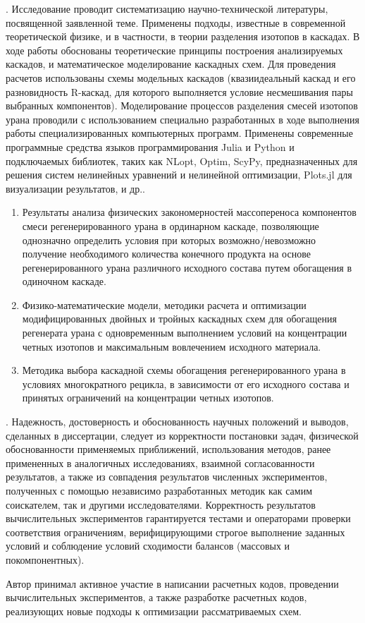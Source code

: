 {\methods}.
Исследование проводит систематизацию научно-технической литературы, посвященной заявленной теме.
Применены подходы, известные в современной теоретической физике, и в частности, в теории разделения изотопов в каскадах.
В ходе работы обоснованы теоретические принципы построения анализируемых каскадов, и математическое моделирование каскадных схем.
Для проведения расчетов использованы схемы модельных каскадов (квазиидеальный каскад и его разновидность R-каскад, для которого выполняется условие несмешивания пары выбранных компонентов). Моделирование процессов разделения смесей изотопов урана проводили с использованием специально разработанных в ходе выполнения работы специализированных компьютерных программ. Применены современные программные средства языков программирования Julia и Python и подключаемых библиотек, таких как NLopt, Optim, ScyPy, предназначенных для решения систем нелинейных уравнений и нелинейной оптимизации, Plots.jl для визуализации результатов, и др..

{}
\begin{enumerate}
  \item Результаты анализа физических закономерностей массопереноса компонентов смеси регенерированного урана в ординарном каскаде, позволяющие однозначно определить условия при которых возможно/невозможно получение необходимого количества конечного продукта на основе регенерированного урана различного исходного состава путем обогащения в одиночном каскаде.
  \item Физико-математические модели, методики расчета и оптимизации модифицированных двойных и тройных каскадных схем для обогащения регенерата урана с одновременным выполнением условий на концентрации четных изотопов и максимальным вовлечением исходного материала.
  \item Методика выбора каскадной схемы обогащения регенерированного урана в условиях многократного рецикла, в зависимости от его исходного состава и принятых ограничений на концентрации четных изотопов.
\end{enumerate}

{\reliability}.
Надежность, достоверность и обоснованность научных положений и выводов, сделанных в диссертации, следует из корректности постановки задач, физической обоснованности применяемых приближений, использования методов, ранее примененных в аналогичных исследованиях, взаимной согласованности результатов, а также из совпадения результатов численных экспериментов, полученных с помощью независимо разработанных методик как самим соискателем, так и другими исследователями. Корректность результатов вычислительных экспериментов гарантируется тестами и операторами проверки соответствия ограничениям, верифицирующими строгое выполнение заданных условий и соблюдение условий сходимости балансов (массовых и покомпонентных).


{\contribution} Автор принимал активное участие в написании расчетных кодов, проведении вычислительных экспериментов, а также разработке расчетных кодов, реализующих новые подходы к оптимизации рассматриваемых схем.


